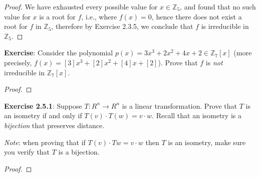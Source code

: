 \documentclass[a4paper]{article}
\begin{document}
\begin{myparindent}{0pt}
\begin{proof}
  We have exhausted every possible value for $x \in \mathbb{Z}_5$, and found
  that no such value for $x$ is a root for $f$, i.e., where $f(x) = 0$, hence
  there does not exist a root for $f$ in $\mathbb{Z}_5$, therefore by Exercise
  2.3.5, we conclude that $f$ is irreducible in $\mathbb{Z}_5$.
\end{proof}

\textbf{Exercise}:
Consider the polynomial $p(x) = 3x^3 + 2x^2 + 4x + 2 \in \mathbb{Z}_7[x]$
(more precisely, $f(x) = [3]x^3 + [2]x^2 + [4]x + [2]$). Prove that $f$ is
\textit{not} irreducible in $\mathbb{Z}_7[x]$.
\newline
\begin{proof}
\end{proof}

\textbf{Exercise 2.5.1}:
Suppose $T:R^n \rightarrow R^n$ is a linear transformation. Prove that $T$ is
an isometry if and only if $T(v) \cdot T(w) = v \cdot w$. Recall that an
isometry is a \textit{bijection} that preserves distance.

\textit{Note}: when
proving that if $T(v) \cdot T{w} = v \cdot w$ then $T$ is an isometry,
make sure you verify that $T$ is a bijection.
\newline
\begin{proof}
\end{proof}

\end{myparindent}
\end{document}
